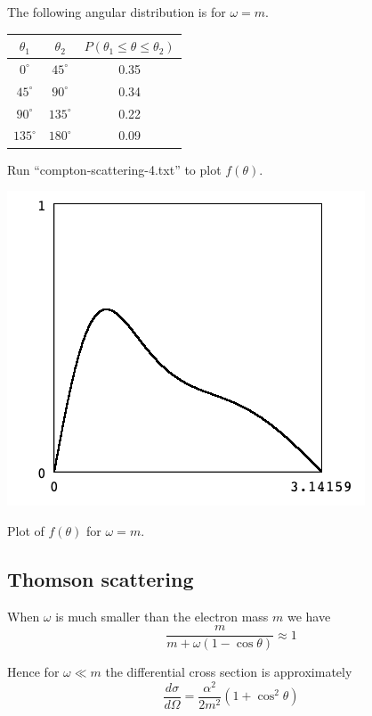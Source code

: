\documentclass[12pt]{article}
\begin{document}
\noindent
The following angular distribution is for $\omega=m$.

\begin{center}
\begin{tabular}{|c|c|c|}
\hline
$\theta_1$ & $\theta_2$ & $P(\theta_1\le\theta\le\theta_2)$\\
\hline
$0^\circ$ & $45^\circ$ & 0.35 \\
$45^\circ$ & $90^\circ$ & 0.34 \\
$90^\circ$ & $135^\circ$ & 0.22 \\
$135^\circ$ & $180^\circ$ & 0.09 \\
\hline
\end{tabular}
\end{center}

\noindent
Run ``compton-scattering-4.txt'' to plot $f(\theta)$.

\begin{center}
\includegraphics[scale=0.5]{compton-scattering-ss1.png}

Plot of $f(\theta)$ for $\omega=m$.
\end{center}

\subsection*{Thomson scattering}

When $\omega$ is much smaller than the electron mass $m$ we have
\begin{equation*}
\frac{m}{m+\omega(1-\cos\theta)}\approx1
\end{equation*}

\noindent
Hence for $\omega\ll m$ the differential cross section is approximately
\begin{equation*}
\frac{d\sigma}{d\Omega}=\frac{\alpha^2}{2m^2}(1+\cos^2\theta)
\end{equation*}
\end{document}
